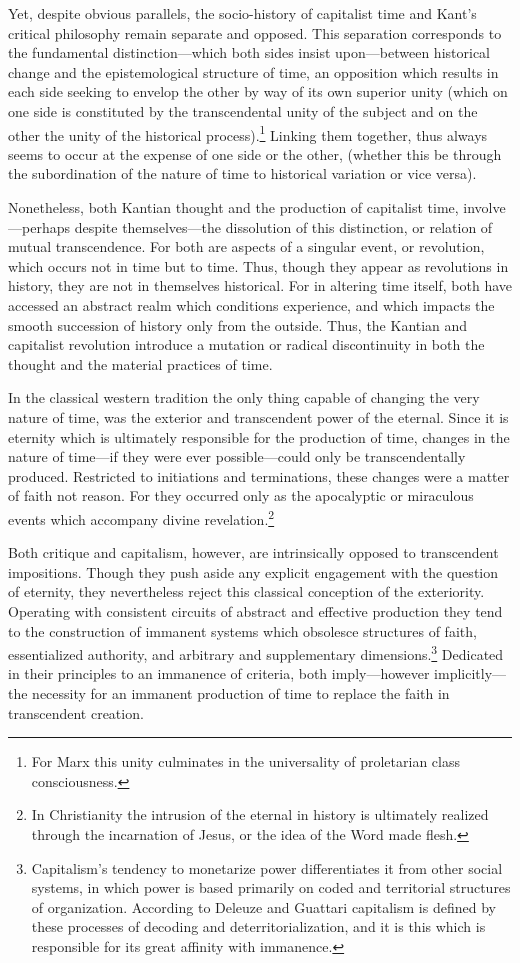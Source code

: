 Yet, despite obvious parallels, the socio-history of capitalist time and Kant's critical philosophy remain separate and opposed. This separation corresponds to the fundamental distinction---which both sides insist upon---between historical change and the epistemological structure of time, an opposition which results in each side seeking to envelop the other by way of its own superior unity (which on one side is constituted by the transcendental unity of the subject and on the other the unity of the historical process).\footnote{For Marx this unity culminates in the universality of proletarian class consciousness.} Linking them together, thus always seems to occur at the expense of one side or the other, (whether this be through the subordination of the nature of time to historical variation or vice versa).

Nonetheless, both Kantian thought and the production of capitalist time, involve---perhaps despite themselves---the dissolution of this distinction, or relation of mutual transcendence. For both are aspects of a singular event, or revolution, which occurs not in time but to time. Thus, though they appear as revolutions in history, they are not in themselves historical. For in altering time itself, both have accessed an abstract realm which conditions experience, and which impacts the smooth succession of history only from the outside. Thus, the Kantian and capitalist revolution introduce a mutation or radical discontinuity in both the thought and the material practices of time.

In the classical western tradition the only thing capable of changing the very nature of time, was the exterior and transcendent power of the eternal. Since it is eternity which is ultimately responsible for the production of time, changes in the nature of time---if they were ever possible---could only be transcendentally produced. Restricted to initiations and terminations, these changes were a matter of faith not reason. For they occurred only as the apocalyptic or miraculous events which accompany divine revelation.\footnote{In Christianity the intrusion of the eternal in history is ultimately realized through the incarnation of Jesus, or the idea of the Word made flesh.}

Both critique and capitalism, however, are intrinsically opposed to transcendent impositions. Though they push aside any explicit engagement with the question of eternity, they nevertheless reject this classical conception of the exteriority. Operating with consistent circuits of abstract and effective production they tend to the construction of immanent systems which obsolesce structures of faith, essentialized authority, and arbitrary and supplementary dimensions.\footnote{Capitalism's tendency to monetarize power differentiates it from other social systems, in which power is based primarily on coded and territorial structures of organization. According to Deleuze and Guattari capitalism is defined by these processes of decoding and deterritorialization, and it is this which is responsible for its great affinity with immanence.} Dedicated in their principles to an immanence of criteria, both imply---however implicitly---the necessity for an immanent production of time to replace the faith in transcendent creation. 


